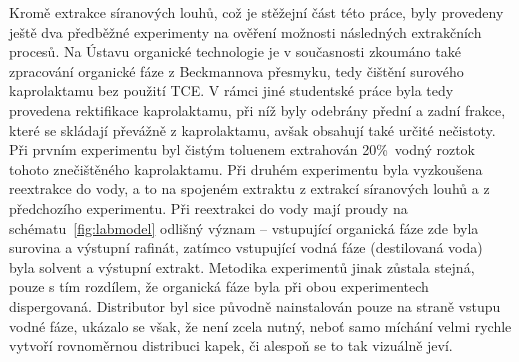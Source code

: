 Kromě extrakce síranových louhů, což je stěžejní část této práce, byly provedeny ještě dva předběžné experimenty na ověření možnosti následných extrakčních procesů.
Na Ústavu organické technologie je v současnosti zkoumáno také zpracování organické fáze z Beckmannova přesmyku, tedy čištění surového kaprolaktamu bez použití TCE.
V rámci jiné studentské práce byla tedy provedena rektifikace kaprolaktamu, při níž byly odebrány přední a zadní frakce, které se skládají převážně z kaprolaktamu, avšak obsahují také určité nečistoty.
Při prvním experimentu byl čistým toluenem extrahován 20\%~vodný roztok tohoto znečištěného kaprolaktamu.
Při druhém experimentu byla vyzkoušena reextrakce do vody, a to na spojeném extraktu z extrakcí síranových louhů a z předchozího experimentu.
Při reextrakci do vody mají proudy na schématu~\ref{fig:labmodel} odlišný význam -- vstupující organická fáze zde byla surovina a výstupní rafinát, zatímco vstupující vodná fáze (destilovaná voda) byla solvent a výstupní extrakt.
Metodika experimentů jinak zůstala stejná, pouze s tím rozdílem, že organická fáze byla při obou experimentech dispergovaná.
Distributor byl sice původně nainstalován pouze na straně vstupu vodné fáze, ukázalo se však, že není zcela nutný, neboť samo míchání velmi rychle vytvoří rovnoměrnou distribuci kapek, či alespoň se to tak vizuálně jeví.
